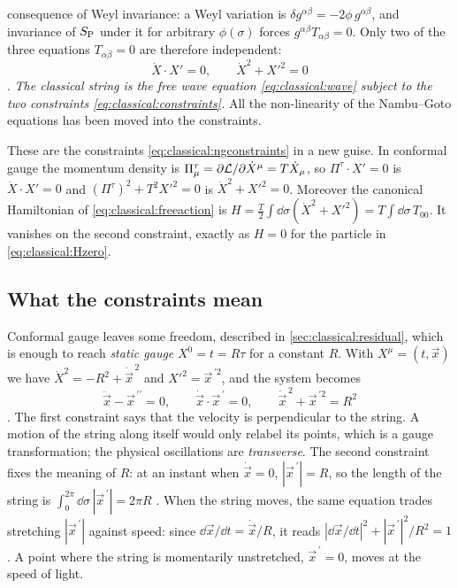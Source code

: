 consequence of Weyl invariance: a Weyl variation is $\delta g^{\alpha\beta}=-2\phi\,
g^{\alpha\beta}$, and invariance of $S_{\rm P}$ under it for arbitrary $\phi(\sigma)$ forces
$g^{\alpha\beta}T_{\alpha\beta}=0$. Only two of the three equations $T_{\alpha\beta}=0$ are
therefore independent:
\begin{equation}\label{eq:classical:constraints}
  \dot X\cdot X'=0,\qquad \dot X^2+X'^2=0
\end{equation}
. \emph{The classical string is the free wave equation
\eqref{eq:classical:wave} subject to the two constraints
\eqref{eq:classical:constraints}.} All the non-linearity of the
Nambu--Goto equations has been moved into the constraints.

These are the constraints \eqref{eq:classical:ngconstraints} in a new guise. In conformal
gauge the momentum density is $\Pi^\tau_\mu=\partial{\cal L}/\partial\dot X^\mu=T\dot X_\mu$,
so $\Pi^\tau\cdot X'=0$ is $\dot X\cdot X'=0$ and $(\Pi^\tau)^2+T^2X'^2=0$ is
$\dot X^2+X'^2=0$. Moreover the canonical Hamiltonian of \eqref{eq:classical:freeaction} is
$H=\frac T2\int\dd\sigma(\dot X^2+X'^2)=T\int\dd\sigma\,T_{00}$. It vanishes on the second
constraint, exactly as $H=0$ for the particle in \eqref{eq:classical:Hzero}.

\subsection{What the constraints mean}\label{sec:classical:static}

Conformal gauge leaves some freedom, described in \cref{sec:classical:residual}, which is
enough to reach \emph{static gauge} $X^0=t=R\tau$ for a constant $R$. With
$X^\mu=(t,\vec x)$ we have $\dot X^2=-R^2+\dot{\vec x}^{\,2}$ and $X'^2=\vec x^{\,\prime2}$, and the
system becomes
\begin{equation}\label{eq:classical:staticgauge}
  \ddot{\vec x}-\vec x^{\,\prime\prime}=0,\qquad \dot{\vec x}\cdot\vec x^{\,\prime}=0,\qquad
  \dot{\vec x}^{\,2}+\vec x^{\,\prime2}=R^2
\end{equation}
. The first constraint says that the velocity is
perpendicular to the string. A motion of the string along itself would only relabel its
points, which is a gauge transformation; the physical oscillations are
\emph{transverse}. The second constraint fixes the meaning of
$R$: at an instant when $\dot{\vec x}=0$, $|\vec x^{\,\prime}|=R$, so the length of the string is
$\int_0^{2\pi}\dd\sigma\,|\vec x^{\,\prime}|=2\pi R$ . When
the string moves, the same equation trades stretching $|\vec x^{\,\prime}|$ against speed: since
$\dd\vec x/\dd t=\dot{\vec x}/R$, it reads $|\dd\vec x/\dd t|^2+|\vec x^{\,\prime}|^2/R^2=1$. A
point where the string is momentarily unstretched, $\vec x^{\,\prime}=0$, moves at the speed
of light.

